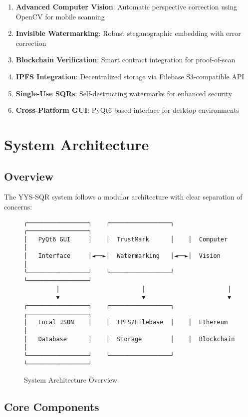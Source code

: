 \documentclass[12pt,a4paper]{article}
\begin{document}
\begin{enumerate}
    \item \textbf{Advanced Computer Vision}: Automatic perspective correction using OpenCV for mobile scanning
    \item \textbf{Invisible Watermarking}: Robust steganographic embedding with error correction
    \item \textbf{Blockchain Verification}: Smart contract integration for proof-of-scan
    \item \textbf{IPFS Integration}: Decentralized storage via Filebase S3-compatible API
    \item \textbf{Single-Use SQRs}: Self-destructing watermarks for enhanced security
    \item \textbf{Cross-Platform GUI}: PyQt6-based interface for desktop environments
\end{enumerate}

\section{System Architecture}

\subsection{Overview}

The YYS-SQR system follows a modular architecture with clear separation of concerns:

\begin{figure}[H]
\centering
\begin{verbatim}
┌─────────────────┐    ┌─────────────────┐    ┌─────────────────┐
│   PyQt6 GUI     │    │  TrustMark      │    │  Computer       │
│   Interface     │◄──►│  Watermarking   │◄──►│  Vision         │
└─────────────────┘    └─────────────────┘    └─────────────────┘
         │                       │                       │
         ▼                       ▼                       ▼
┌─────────────────┐    ┌─────────────────┐    ┌─────────────────┐
│   Local JSON    │    │  IPFS/Filebase  │    │  Ethereum       │
│   Database      │    │  Storage        │    │  Blockchain     │
└─────────────────┘    └─────────────────┘    └─────────────────┘
\end{verbatim}
\caption{System Architecture Overview}
\end{figure}

\subsection{Core Components}
\end{document}
